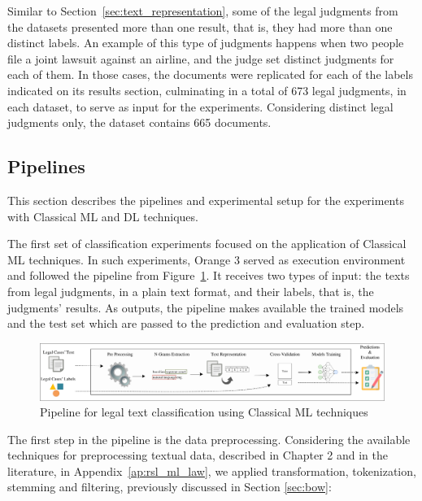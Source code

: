 Similar to Section~\ref{sec:text_representation}, some of the legal judgments from the datasets presented more than one result, that is, they had more than one distinct labels. An example of this type of judgments happens when two people file a joint lawsuit against an airline, and the judge set distinct judgments for each of them. In those cases, the documents were replicated for each of the labels indicated on its results section, culminating in a total of 673 legal judgments, in each dataset, to serve as input for the experiments. Considering distinct legal judgments only, the dataset contains 665 documents.




\subsection{Pipelines}

This section describes the pipelines and experimental setup for the experiments with Classical \gls{ML} and \gls{DL} techniques.

The first set of classification experiments focused on the application of Classical \gls{ML} techniques. In such experiments, Orange 3 served as execution environment and followed the pipeline from Figure~\ref{fig:cap4_pipeline_superv_ml}. It receives two types of input: the texts from legal judgments, in a plain text format, and their labels, that is, the judgments' results. As outputs, the pipeline makes available the trained models and the test set which are passed to the prediction and evaluation step.


\begin{figure}[htb]
    \centering
    \caption{Pipeline for legal text classification using Classical ML techniques}
    \label{fig:cap4_pipeline_superv_ml}
    \includegraphics[width=\textwidth]{images/chapters/cap4_classification_pipeline.pdf}
\end{figure}


The first step in the pipeline is the data preprocessing. Considering the available techniques for preprocessing textual data, described in Chapter 2 and in the literature, in Appendix~\ref{ap:rsl_ml_law},  we applied transformation, tokenization, stemming and filtering, previously discussed in Section \ref{sec:bow}:

